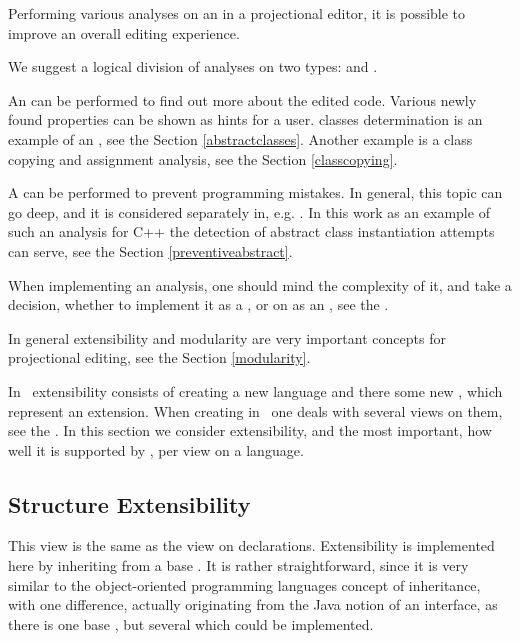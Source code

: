 Performing various analyses on an  in a projectional editor, it is possible to improve an overall 
editing experience.

We suggest a logical division of analyses on two types:  and .

An  can be performed to find out more about the edited code. Various newly found properties
can be shown as hints for a user.  classes determination is an example of an , see the Section \ref{abstractclasses}. Another example
is a class copying and assignment analysis, see the Section \ref{classcopying}.

A  can be performed to prevent programming mistakes. In general, this topic can go deep, and it is considered separately in, e.g. 
\cite{2012_ratiu_modular_dsls_and_analyses}. In this work as an example of such an analysis for C++ the detection of abstract class instantiation
attempts can serve, see the Section \ref{preventiveabstract}.

When implementing an analysis, one should mind the complexity of it, and take a decision, whether to implement it as a , or
on as an , see the .



In general  extensibility and modularity are very important concepts for projectional editing, see the Section \ref{modularity}.

In \jbmps\  extensibility consists of creating a new language and there some new , which represent an extension.
When creating  in \jbmps\ one deals with several views on them, see the . In this section we consider extensibility, and 
the most important, how well it is supported by \jbmps, per view on a language.

\subsection{Structure Extensibility}

This view is the same as the view on  declarations.
Extensibility is implemented here by inheriting from a base . It is rather straightforward, 
since it is very similar to the object-oriented programming languages concept of inheritance, with one difference, 
actually originating from the Java notion of an interface, as there is one base , but several 
which could be implemented.

